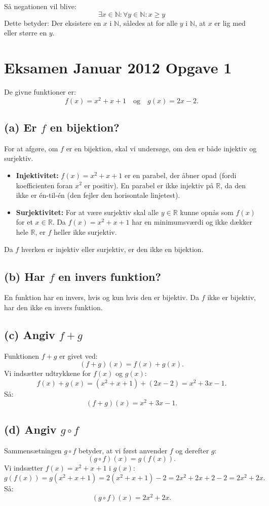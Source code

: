 \documentclass{article}
\begin{document}
Så negationen vil blive: 
 \vspace{10pt}
 $$\exists x \in \mathbb{N} : \forall y \in \mathbb{N} : x \geq y$$
Dette betyder: Der eksistere en $x$ i $\mathbb{N}$, således at for alle $y$ i $\mathbb{N}$, at $x$ er lig med eller større en $y$. 
  
\section{Eksamen Januar 2012 Opgave 1}
De givne funktioner er:
\[
f(x) = x^2 + x + 1 \quad \text{og} \quad g(x) = 2x - 2.
\]

\subsection*{(a) Er \( f \) en bijektion?}
For at afgøre, om \( f \) er en bijektion, skal vi undersøge, om den er både injektiv og surjektiv.

\begin{itemize}
    \item \textbf{Injektivitet:} \( f(x) = x^2 + x + 1 \) er en parabel, der åbner opad (fordi koefficienten foran \( x^2 \) er positiv). En parabel er ikke injektiv på \( \mathbb{R} \), da den ikke er én-til-én (den fejler den horisontale linjetest).
    
    \item \textbf{Surjektivitet:} For at være surjektiv skal alle \( y \in \mathbb{R} \) kunne opnås som \( f(x) \) for et \( x \in \mathbb{R} \). Da \( f(x) = x^2 + x + 1 \) har en minimumsværdi og ikke dækker hele \( \mathbb{R} \), er \( f \) heller ikke surjektiv.
\end{itemize}

Da \( f \) hverken er injektiv eller surjektiv, er den ikke en bijektion.

\subsection*{(b) Har \( f \) en invers funktion?}
En funktion har en invers, hvis og kun hvis den er bijektiv. Da \( f \) ikke er bijektiv, har den ikke en invers funktion.

\subsection*{(c) Angiv \( f + g \)}
Funktionen \( f + g \) er givet ved:
\[
(f + g)(x) = f(x) + g(x).
\]
Vi indsætter udtrykkene for \( f(x) \) og \( g(x) \):
\[
f(x) + g(x) = (x^2 + x + 1) + (2x - 2) = x^2 + 3x - 1.
\]
Så:
\[
(f + g)(x) = x^2 + 3x - 1.
\]

\subsection*{(d) Angiv \( g \circ f \)}
Sammensætningen \( g \circ f \) betyder, at vi først anvender \( f \) og derefter \( g \):
\[
(g \circ f)(x) = g(f(x)).
\]
Vi indsætter \( f(x) = x^2 + x + 1 \) i \( g(x) \):
\[
g(f(x)) = g(x^2 + x + 1) = 2(x^2 + x + 1) - 2 = 2x^2 + 2x + 2 - 2 = 2x^2 + 2x.
\]
Så:
\[
(g \circ f)(x) = 2x^2 + 2x.
\]
\end{document}
